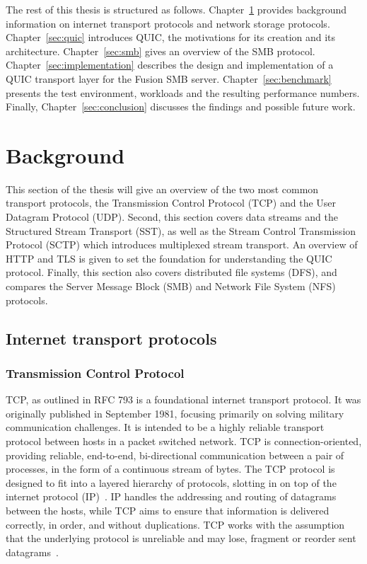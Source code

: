 \documentclass[english, 12pt, a4paper, elec, utf8, a-2b, online]{aaltothesis}
\begin{document}
The rest of this thesis is structured as follows. Chapter~\ref{sec:background} provides
background information on internet transport protocols and network storage protocols. Chapter~\ref{sec:quic} introduces
QUIC, the motivations for its creation and its architecture. Chapter~\ref{sec:smb} gives
an overview of the SMB protocol. Chapter~\ref{sec:implementation} describes the design
and implementation of a QUIC transport layer for the Fusion SMB server. Chapter~\ref{sec:benchmark}
presents the test environment, workloads and the resulting performance numbers. Finally, Chapter~\ref{sec:conclusion}
discusses the findings and possible future work.
\clearpage

\section{Background}
\label{sec:background}
This section of the thesis will give an overview of the two most common transport
protocols, the Transmission Control Protocol (TCP) and the User Datagram Protocol (UDP).
Second, this section covers data streams and the Structured Stream Transport (SST),
as well as the Stream Control Transmission Protocol (SCTP) which introduces multiplexed
stream transport. An overview of HTTP and TLS is given to set the foundation for
understanding the QUIC protocol. Finally, this section also covers distributed
file systems (DFS), and compares the Server Message Block (SMB) and Network File System (NFS) protocols.
\subsection{Internet transport protocols}
\subsubsection{Transmission Control Protocol}
TCP, as outlined in RFC 793 is a foundational internet transport protocol. It was
originally published in September 1981, focusing primarily on solving military
communication challenges. It is intended to be a highly reliable transport
protocol between hosts in a packet switched network. TCP is connection-oriented,
providing reliable, end-to-end, bi-directional communication between a pair of processes, in the
form of a continuous stream of bytes. The TCP protocol is designed to fit into
a layered hierarchy of protocols, slotting
in on top of the internet protocol (IP)~\cite{rfc791}. IP handles the addressing
and routing of datagrams between the hosts, while TCP aims to ensure that
information is delivered correctly, in order, and without duplications. TCP works with
the assumption that the underlying protocol is unreliable and may lose,
fragment or reorder sent datagrams~\cite{rfc793}.
\end{document}
